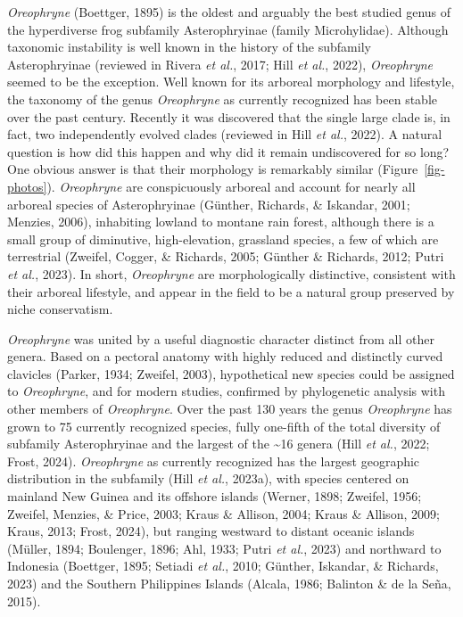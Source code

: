 \documentclass[
  letterpaper,
  DIV=11,
  numbers=noendperiod]{scrartcl}
\begin{document}
\emph{Oreophryne} (Boettger, 1895) is the oldest and arguably the best
studied genus of the hyperdiverse frog subfamily Asterophryinae (family
Microhylidae). Although taxonomic instability is well known in the
history of the subfamily Asterophryinae (reviewed in Rivera \emph{et
al.}, 2017; Hill \emph{et al.}, 2022), \emph{Oreophryne} seemed to be
the exception. Well known for its arboreal morphology and lifestyle, the
taxonomy of the genus \emph{Oreophryne} as currently recognized has been
stable over the past century. Recently it was discovered that the single
large clade is, in fact, two independently evolved clades (reviewed in
Hill \emph{et al.}, 2022). A natural question is how did this happen and
why did it remain undiscovered for so long? One obvious answer is that
their morphology is remarkably similar (Figure~\ref{fig-photos}).
\emph{Oreophryne} are conspicuously arboreal and account for nearly all
arboreal species of Asterophryinae (Günther, Richards, \& Iskandar,
2001; Menzies, 2006), inhabiting lowland to montane rain forest,
although there is a small group of diminutive, high-elevation, grassland
species, a few of which are terrestrial (Zweifel, Cogger, \& Richards,
2005; Günther \& Richards, 2012; Putri \emph{et al.}, 2023). In short,
\emph{Oreophryne} are morphologically distinctive, consistent with their
arboreal lifestyle, and appear in the field to be a natural group
preserved by niche conservatism.

\emph{Oreophryne} was united by a useful diagnostic character distinct
from all other genera. Based on a pectoral anatomy with highly reduced
and distinctly curved clavicles (Parker, 1934; Zweifel, 2003),
hypothetical new species could be assigned to \emph{Oreophryne}, and for
modern studies, confirmed by phylogenetic analysis with other members of
\emph{Oreophryne}. Over the past 130 years the genus \emph{Oreophryne}
has grown to 75 currently recognized species, fully one-fifth of the
total diversity of subfamily Asterophryinae and the largest of the
\textasciitilde16 genera (Hill \emph{et al.}, 2022; Frost, 2024).
\emph{Oreophryne} as currently recognized has the largest geographic
distribution in the subfamily (Hill \emph{et al.}, 2023a), with species
centered on mainland New Guinea and its offshore islands (Werner, 1898;
Zweifel, 1956; Zweifel, Menzies, \& Price, 2003; Kraus \& Allison, 2004;
Kraus \& Allison, 2009; Kraus, 2013; Frost, 2024), but ranging westward
to distant oceanic islands (Müller, 1894; Boulenger, 1896; Ahl, 1933;
Putri \emph{et al.}, 2023) and northward to Indonesia (Boettger, 1895;
Setiadi \emph{et al.}, 2010; Günther, Iskandar, \& Richards, 2023) and
the Southern Philippines Islands (Alcala, 1986; Balinton \& de la Seña,
2015).
\end{document}
